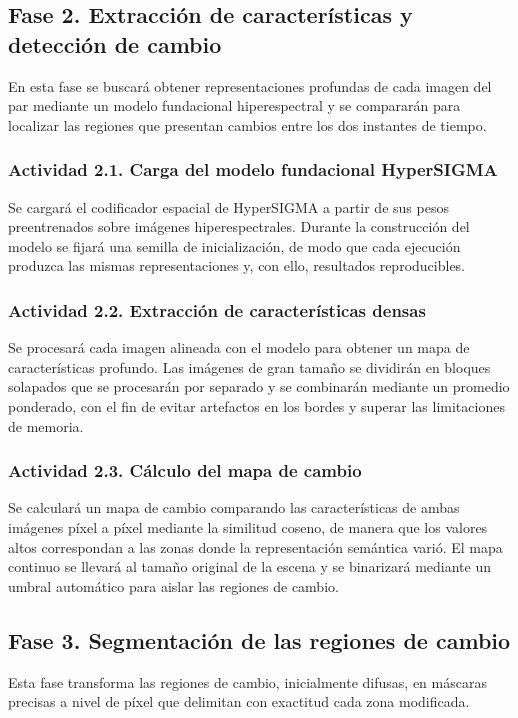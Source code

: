 \documentclass[12pt,onecolumn]{IEEEtran}
\begin{document}
\subsection{{Fase 2. Extracción de características y detección de cambio}}
En esta fase se buscará obtener representaciones profundas de cada imagen del par mediante un modelo fundacional hiperespectral y se compararán para localizar las regiones que presentan cambios entre los dos instantes de tiempo.

\subsubsection{{Actividad 2.1. Carga del modelo fundacional HyperSIGMA}}

Se cargará el codificador espacial de HyperSIGMA a partir de sus pesos preentrenados sobre imágenes hiperespectrales. Durante la construcción del modelo se fijará una semilla de inicialización, de modo que cada ejecución produzca las mismas representaciones y, con ello, resultados reproducibles.

\subsubsection{{Actividad 2.2. Extracción de características densas}}

Se procesará cada imagen alineada con el modelo para obtener un mapa de características profundo. Las imágenes de gran tamaño se dividirán en bloques solapados que se procesarán por separado y se combinarán mediante un promedio ponderado, con el fin de evitar artefactos en los bordes y superar las limitaciones de memoria.

\subsubsection{{Actividad 2.3. Cálculo del mapa de cambio}}

Se calculará un mapa de cambio comparando las características de ambas imágenes píxel a píxel mediante la similitud coseno, de manera que los valores altos correspondan a las zonas donde la representación semántica varió. El mapa continuo se llevará al tamaño original de la escena y se binarizará mediante un umbral automático para aislar las regiones de cambio.



\subsection{{Fase 3. Segmentación de las regiones de cambio}}
Esta fase transforma las regiones de cambio, inicialmente difusas, en máscaras precisas a nivel de píxel que delimitan con exactitud cada zona modificada.
\end{document}
